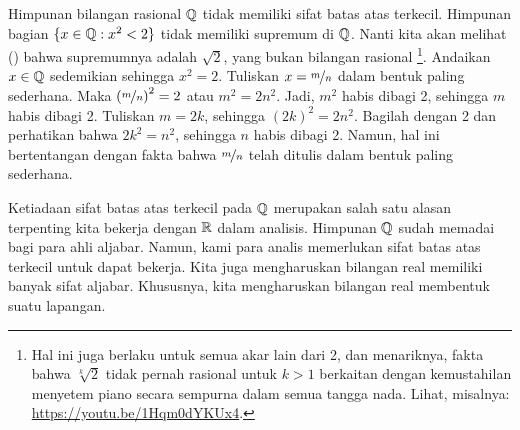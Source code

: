 \begin{example}
Himpunan bilangan rasional ${\mathbb{Q}}$ tidak memiliki sifat batas atas terkecil.  Himpunan bagian
$\{ x \in {\mathbb{Q}} : x^2 < 2 \}$ tidak memiliki supremum di ${\mathbb{Q}}$.  Nanti
kita akan melihat () bahwa supremumnya adalah
$\sqrt{2}$, yang bukan bilangan rasional%
\footnote{Hal ini juga berlaku untuk semua akar lain dari 2, dan menariknya,
fakta bahwa $\sqrt[k]{2}$ tidak pernah rasional untuk $k > 1$ berkaitan dengan
kemustahilan menyetem piano
secara sempurna dalam semua tangga nada.  Lihat, misalnya:
\url{https://youtu.be/1Hqm0dYKUx4}.}.
Andaikan $x \in {\mathbb{Q}}$ sedemikian sehingga $x^2 = 2$.
Tuliskan $x=\nicefrac{m}{n}$ dalam bentuk paling sederhana.  Maka ${(\nicefrac{m}{n})}^2 = 2$
atau
$m^2 = 2n^2$.  Jadi, $m^2$ habis dibagi 2, sehingga $m$ habis dibagi
2.  Tuliskan $m = 2k$, sehingga ${(2k)}^2 = 2n^2$.  Bagilah dengan 2
dan perhatikan bahwa $2k^2 = n^2$, sehingga $n$ habis dibagi 2.  Namun, hal ini
bertentangan dengan fakta bahwa $\nicefrac{m}{n}$ telah ditulis dalam bentuk paling sederhana.
\end{example}

Ketiadaan sifat batas atas terkecil pada ${\mathbb{Q}}$ merupakan salah satu alasan terpenting
kita bekerja dengan ${\mathbb{R}}$ dalam analisis.  Himpunan ${\mathbb{Q}}$
sudah memadai bagi para ahli aljabar.  Namun, kami para analis memerlukan sifat batas atas
terkecil untuk dapat bekerja.
Kita juga mengharuskan bilangan real memiliki banyak sifat aljabar.
Khususnya, kita mengharuskan bilangan real membentuk suatu lapangan.


